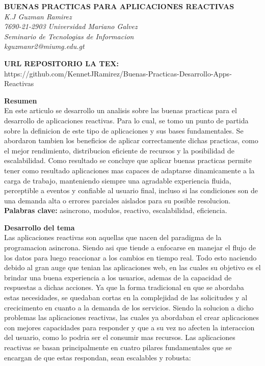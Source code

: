 \documentclass[12pt]{article}
\begin{document}
\begin{center}
    {\bfseries\uppercase{Buenas practicas para aplicaciones reactivas}} \\
    {\itshape K.J Guzman Ramirez}\\
    {\itshape 7690-21-2903 Universidad Mariano Galvez} \\
    {\itshape Seminario de Tecnologias de Informacion} \\
    {\itshape kguzmanr2@miumg.edu.gt} \\
\end{center}

\textbf{URL REPOSITORIO LA TEX: } \\
https://github.com/KennetJRamirez/Buenas-Practicas-Desarrollo-Apps-Reactivas

\vspace{1em}
\noindent\textbf{Resumen}\\
En este articulo se desarrollo un analisis sobre las buenas practicas para el desarrollo de aplicaciones reactivas. Para lo cual, se tomo un punto de partida sobre la definicion de este tipo de aplicaciones y sus bases fundamentales. Se abordaron tambien los beneficios de aplicar correctamente dichas practicas, como el mejor rendimiento, distribucion eficiente de recursos y la posibilidad de escalabilidad. Como resultado se concluye que aplicar buenas practicas permite tener como resultado aplicaciones mas capaces de adaptarse dinamicamente a la carga de trabajo, manteniendo siempre una agradable experiencia fluida, perceptible a eventos y confiable al usuario final, incluso si las condiciones son de una demanda alta o errores parciales aislados para su posible resolucion. \\

\noindent\textbf{Palabras clave: } asincrono, modulos, reactivo, escalabilidad, eficiencia.

\vspace{1em}
\noindent\textbf{Desarrollo del tema} \\
Las aplicaciones reactivas son aquellas que nacen del paradigma de la programacion asincrona. Siendo asi que tiende a enfocarse en manejar el flujo de los datos para luego reaccionar a los cambios en tiempo real. 
Todo esto naciendo debido al gran auge que tenian las aplicaciones web, en las cuales su objetivo es el brindar una buena experiencia a los usuarios, ademas de la capacidad de respuestas a dichas acciones. Ya que la forma tradicional en que se abordaba estas necesidades, se quedaban cortas en la complejidad de las solicitudes y al crecicimento en cuanto a la demanda de los servicios. Siendo la solucion a dicho problemas las aplicaciones reactivas, las cuales ya abordaban el crear aplicaciones con mejores capacidades para responder y que a su vez no afecten la interaccion del usuario, como lo podria ser el consumir mas recursos. 
Las aplicaciones reactivas se basan principalmente en cuatro pilares fundamentales que se encargan de que estas respondan, sean escalables y robusta: 
\end{document}
